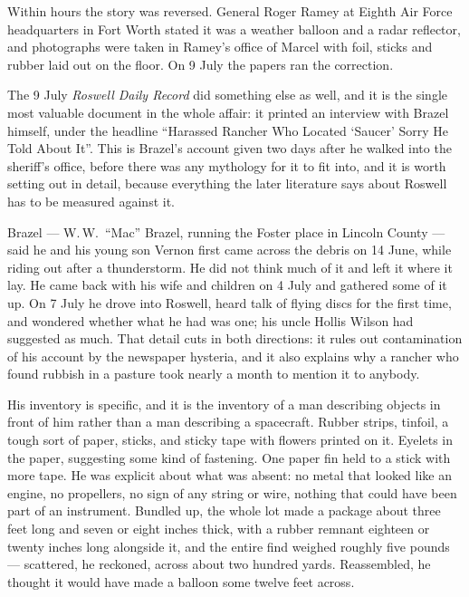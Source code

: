 Within hours the story was reversed. General Roger Ramey at Eighth Air Force headquarters in Fort
Worth stated it was a weather balloon and a radar reflector, and photographs were taken in Ramey's
office of Marcel with foil, sticks and rubber laid out on the floor. On 9 July the papers ran the
correction.

The 9 July \emph{Roswell Daily Record} did something else as well, and it is the single most
valuable document in the whole affair: it printed an interview with Brazel himself, under the
headline ``Harassed Rancher Who Located `Saucer' Sorry He Told About It''. This is Brazel's account
given two days after he walked into the sheriff's office, before there was any mythology for it to
fit into, and it is worth setting out in detail, because everything the later literature says about
Roswell has to be measured against it.

Brazel --- W.\,W.\ ``Mac'' Brazel, running the Foster place in Lincoln County --- said he and his
young son Vernon first came across the debris on 14 June, while riding out after a thunderstorm. He
did not think much of it and left it where it lay. He came back with his wife and children on 4 July
and gathered some of it up. On 7 July he drove into Roswell, heard talk of flying discs for the first
time, and wondered whether what he had was one; his uncle Hollis Wilson had suggested as much.
 That
detail cuts in both directions: it rules out contamination of his account by the newspaper hysteria,
and it also explains why a rancher who found rubbish in a pasture took nearly a month to mention it
to anybody.

His inventory is specific, and it is the inventory of a man describing objects in front of him rather
than a man describing a spacecraft. Rubber strips, tinfoil, a tough sort of paper, sticks, and sticky
tape with flowers printed on it. Eyelets in the paper, suggesting some kind of fastening. One paper
fin held to a stick with more tape. He was explicit about what was absent: no metal that looked like
an engine, no propellers, no sign of any string or wire, nothing that could have been part of an
instrument. Bundled up, the whole lot made a package about three feet long and seven or eight inches
thick, with a rubber remnant eighteen or twenty inches long alongside it, and the entire find weighed
roughly five pounds --- scattered, he reckoned, across about two hundred yards. Reassembled, he
thought it would have made a balloon some twelve feet across.


